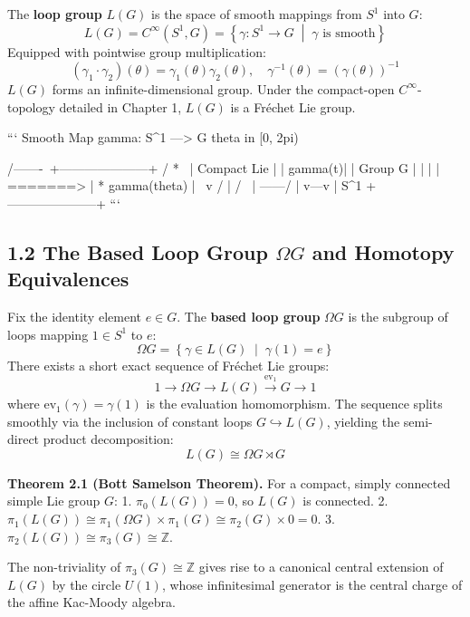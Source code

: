 \documentclass[11pt,twoside,openright]{amsbook}
\begin{document}
The \textbf{loop group} $L(G)$ is the space of smooth mappings from $S^1$ into $G$:
$$L(G) = C^\infty(S^1, G) = \left\{ \gamma: S^1 \longrightarrow G \;\middle|\; \gamma \text{ is smooth} \right\}$$
Equipped with pointwise group multiplication:
$$(\gamma_1 \cdot \gamma_2)(\theta) = \gamma_1(\theta) \gamma_2(\theta), \quad \gamma^{-1}(\theta) = (\gamma(\theta))^{-1}$$
$L(G)$ forms an infinite-dimensional group. Under the compact-open $C^\infty$-topology detailed in Chapter 1, $L(G)$ is a Fréchet Lie group.

```
       Smooth Map gamma: S^1 ---> G
           theta in [0, 2pi)
                 
           /-------\               +---------------------+
          /    *    \              |   Compact Lie       |
         |   gamma(t)|             |   Group G           |
         |     |     |   =======>  |      * gamma(theta) |
          \    v    /              |     / \             |
           \-------/               |    v---v            |
             S^1                   +---------------------+
```

\subsection{1.2 The Based Loop Group $\Omega G$ and Homotopy Equivalences}
Fix the identity element $e \in G$. The \textbf{based loop group} $\Omega G$ is the subgroup of loops mapping $1 \in S^1$ to $e$:
$$\Omega G = \left\{ \gamma \in L(G) \;\middle|\; \gamma(1) = e \right\}$$
There exists a short exact sequence of Fréchet Lie groups:
$$1 \longrightarrow \Omega G \longrightarrow L(G) \overset{\mathrm{ev}_1}{\longrightarrow} G \longrightarrow 1$$
where $\mathrm{ev}_1(\gamma) = \gamma(1)$ is the evaluation homomorphism. The sequence splits smoothly via the inclusion of constant loops $G \hookrightarrow L(G)$, yielding the semi-direct product decomposition:
$$L(G) \cong \Omega G \rtimes G$$

\textbf{Theorem 2.1 (Bott Samelson Theorem).} For a compact, simply connected simple Lie group $G$:
1. $\pi_0(L(G)) = 0$, so $L(G)$ is connected.
2. $\pi_1(L(G)) \cong \pi_1(\Omega G) \times \pi_1(G) \cong \pi_2(G) \times 0 = 0$.
3. $\pi_2(L(G)) \cong \pi_3(G) \cong \mathbb{Z}$.

The non-triviality of $\pi_3(G) \cong \mathbb{Z}$ gives rise to a canonical central extension of $L(G)$ by the circle $U(1)$, whose infinitesimal generator is the central charge of the affine Kac-Moody algebra.
\end{document}
